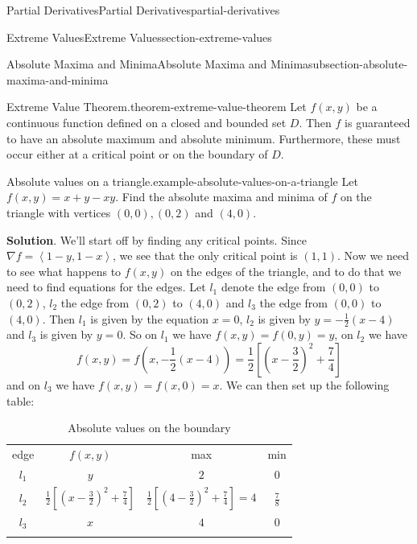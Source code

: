 \documentclass[oneside,10pt,]{book}
\numberwithin{equation}{section}
\newcommand{\hrulethin}  {\noalign{\hrule height 0.04em}}
\newcommand{\hrulethick} {\noalign{\hrule height 0.11em}}
\newcommand{\grad}{\nabla}
\newcommand{\dotprod}[1]{\left\langle #1 \right\rangle}
\begin{document}
\begin{chapterptx}{Partial Derivatives}{}{Partial Derivatives}{}{}{partial-derivatives}
\begin{sectionptx}{Extreme Values}{}{Extreme Values}{}{}{section-extreme-values}
\begin{subsectionptx}{Absolute Maxima and Minima}{}{Absolute Maxima and Minima}{}{}{subsection-absolute-maxima-and-minima}
\begin{theorem}{Extreme Value Theorem.}{}{theorem-extreme-value-theorem}%
\hypertarget{p-1435}{}%
Let \(f(x,y)\) be a continuous function defined on a closed and bounded set \(D\). \footnotemark{} Then \(f\) is guaranteed to have an absolute maximum and absolute minimum. Furthermore, these must occur either at a critical point or on the boundary of \(D\).%
\end{theorem}
%
\begin{example}{Absolute values on a triangle.}{example-absolute-values-on-a-triangle}%
\hypertarget{p-1436}{}%
Let \(f(x,y) = x + y - xy\). Find the absolute maxima and minima of \(f\) on the triangle with vertices \((0,0), (0,2)\) and \((4,0)\).%
\par\smallskip%
\noindent\textbf{Solution}.\hypertarget{solution-233}{}\quad%
\hypertarget{p-1437}{}%
We'll start off by finding any critical points. Since \(\grad f = \dotprod{1-y, 1-x}\), we see that the only critical point is \((1,1)\). Now we need to see what happens to \(f(x,y)\) on the edges of the triangle, and to do that we need to find equations for the edges. Let \(l_{1}\) denote the edge from \((0,0)\) to \((0,2)\), \(l_{2}\) the edge from \((0,2)\) to \((4,0)\) and \(l_{3}\) the edge from \((0,0)\) to \((4,0)\). Then \(l_{1}\) is given by the equation \(x = 0\), \(l_{2}\) is given by \(y = -\frac{1}{2}(x-4)\) and \(l_{3}\) is given by \(y = 0\). So on \(l_{1}\) we have \(f(x,y) = f(0,y) = y\), on \(l_{2}\) we have%
\begin{equation*}
f(x,y) = f\left(x,-\frac{1}{2}(x-4)\right) = \frac{1}{2}\left[\left(x-\frac{3}{2}\right)^{2} + \frac{7}{4}\right]
\end{equation*}
and on \(l_{3}\) we have \(f(x,y) = f(x,0) = x\). We can then set up the following table:%
\begin{table}
\centering
\begin{tabular}{cccc}\hrulethick
edge&\(f(x,y)\)&max&min\tabularnewline\hrulethin
\(l_{1}\)&\(y\)&\(2\)&\(0\)\tabularnewline[0pt]
\(l_{2}\)&\(\frac{1}{2}\left[\left(x-\frac{3}{2}\right)^{2} + \frac{7}{4}\right]\)&\(\frac{1}{2}\left[\left(4-\frac{3}{2}\right)^{2} + \frac{7}{4}\right] = 4\)&\(\frac{7}{8}\)\tabularnewline[0pt]
\(l_{3}\)&\(x\)&\(4\)&\(0\)\tabularnewline\hrulethick
\end{tabular}
\caption{Absolute values on the boundary\label{table-triangle-extrema}}

\end{table}
\end{example}
\end{subsectionptx}
\end{sectionptx}
\end{chapterptx}
\end{document}
